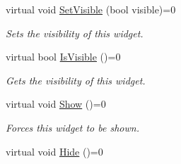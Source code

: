 \begin{DoxyCompactItemize}
virtual void \hyperlink{classphys_1_1UI_1_1Cell_aceb2d399897a502d99c72b2e9e5c859e}{SetVisible} (bool visible)=0
\begin{DoxyCompactList}\small\item\em Sets the visibility of this widget. \item\end{DoxyCompactList}\item 
virtual bool \hyperlink{classphys_1_1UI_1_1Cell_a77625842ac8ad87bd5b5a7f6ed0590b8}{IsVisible} ()=0
\begin{DoxyCompactList}\small\item\em Gets the visibility of this widget. \item\end{DoxyCompactList}\item 
\hypertarget{classphys_1_1UI_1_1Cell_ae0d424d873b9bb8712afbcc1bd548dc0}{
virtual void \hyperlink{classphys_1_1UI_1_1Cell_ae0d424d873b9bb8712afbcc1bd548dc0}{Show} ()=0}
\label{classphys_1_1UI_1_1Cell_ae0d424d873b9bb8712afbcc1bd548dc0}

\begin{DoxyCompactList}\small\item\em Forces this widget to be shown. \item\end{DoxyCompactList}\item 
\hypertarget{classphys_1_1UI_1_1Cell_a73b4c96e986bbd0f28cc542bcc4c8d7c}{
virtual void \hyperlink{classphys_1_1UI_1_1Cell_a73b4c96e986bbd0f28cc542bcc4c8d7c}{Hide} ()=0}
\label{classphys_1_1UI_1_1Cell_a73b4c96e986bbd0f28cc542bcc4c8d7c}


\end{DoxyCompactItemize}
